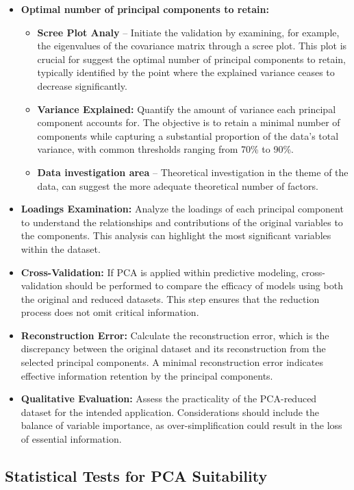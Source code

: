 \documentclass[conference]{IEEEtran}
\begin{document}
\begin{itemize}
 \item \textbf{Optimal number of principal components to retain:}
\begin{itemize}  \item \textbf{Scree Plot Analy} -- Initiate the validation by examining, for example, the eigenvalues of the covariance matrix through a scree plot. This plot is crucial for suggest the optimal number of principal components to retain, typically identified by the point where the explained variance ceases to decrease significantly.
  \item \textbf{Variance Explained:} Quantify the amount of variance each principal component accounts for. The objective is to retain a minimal number of components while capturing a substantial proportion of the data's total variance, with common thresholds ranging from 70\% to 90\%.
  \item \textbf{Data investigation area} -- Theoretical investigation in the theme of the data, can suggest the more adequate theoretical number of factors.
\end{itemize}
  \item \textbf{Loadings Examination:} Analyze the loadings of each principal component to understand the relationships and contributions of the original variables to the components. This analysis can highlight the most significant variables within the dataset.
  \item \textbf{Cross-Validation:} If PCA is applied within predictive modeling, cross-validation should be performed to compare the efficacy of models using both the original and reduced datasets. This step ensures that the reduction process does not omit critical information.
  \item \textbf{Reconstruction Error:} Calculate the reconstruction error, which is the discrepancy between the original dataset and its reconstruction from the selected principal components. A minimal reconstruction error indicates effective information retention by the principal components.
  \item \textbf{Qualitative Evaluation:} Assess the practicality of the PCA-reduced dataset for the intended application. Considerations should include the balance of variable importance, as over-simplification could result in the loss of essential information.
\end{itemize}

\subsection{Statistical Tests for PCA Suitability}
\end{document}

